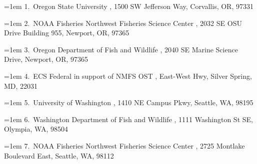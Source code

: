 \documentclass[
]{scrartcl}
\begin{document}
\begin{titlepage}
\begin{minipage}[b][\textheight][s]{\textwidth}

  \vspace{2\baselineskip}

  \hangindent=1em
  {1}.~{Oregon State University}%
  , %
  {1500 SW Jefferson Way, Corvallis, OR, 97331}%
  \par\hangindent=1em%
  {2}.~{NOAA Fisheries Northwest Fisheries Science Center}%
  , %
  {2032 SE OSU Drive Building 955, Newport, OR, 97365}%
  \par\hangindent=1em%
  {3}.~{Oregon Department of Fish and Wildlife}%
  , %
  {2040 SE Marine Science Drive, Newport, OR, 97365}%
  \par\hangindent=1em%
  {4}.~{ECS Federal in support of NMFS OST}%
  , %
  {East-West Hwy, Silver Spring, MD, 22031}%
  \par\hangindent=1em%
  {5}.~{University of Washington}%
  , %
  {1410 NE Campus Pkwy, Seattle, WA, 98195}%
  \par\hangindent=1em%
  {6}.~{Washington Department of Fish and Wildlife}%
  , %
  {1111 Washington St SE, Olympia, WA, 98504}%
  \par\hangindent=1em%
  {7}.~{NOAA Fisheries Northwest Fisheries Science Center}%
  , %
  {2725 Montlake Boulevard East, Seattle, WA, 98112}%


  \vspace{1\baselineskip}



  \vfill


  \vspace{1\baselineskip}


\end{minipage}
\end{titlepage}
\end{document}
